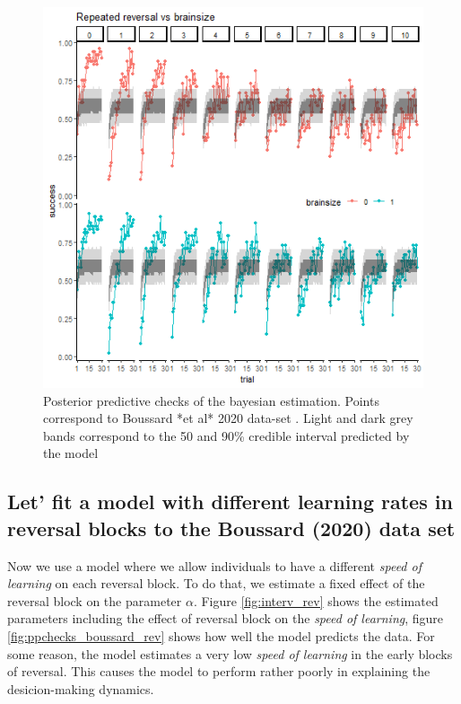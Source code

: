 \documentclass[
]{article}
\begin{document}
\begin{figure}

\includegraphics[width=6.67in,]{images/boussard_ppchecks} \hfill{}

\caption{Posterior predictive checks of the bayesian estimation. Points correspond to Boussard *et al* 2020 data-set . Light and dark grey bands correspond to the 50 and 90\% credible interval predicted by the model}\label{fig:ppchecks_boussard}
\end{figure}

\hypertarget{let-fit-a-model-with-different-learning-rates-in-reversal-blocks-to-the-boussard--boussard_brain_2020-data-set}{%
\subsection{Let' fit a model with different learning rates in reversal
blocks to the Boussard (2020) data
set}\label{let-fit-a-model-with-different-learning-rates-in-reversal-blocks-to-the-boussard--boussard_brain_2020-data-set}}

Now we use a model where we allow individuals to have a different
\emph{speed of learning} on each reversal block. To do that, we estimate
a fixed effect of the reversal block on the parameter \(\alpha\). Figure
\ref{fig:interv_rev} shows the estimated parameters including the effect
of reversal block on the \emph{speed of learning}, figure
\ref{fig:ppchecks_boussard_rev} shows how well the model predicts the
data. For some reason, the model estimates a very low \emph{speed of
learning} in the early blocks of reversal. This causes the model to
perform rather poorly in explaining the desicion-making dynamics.
\end{document}
